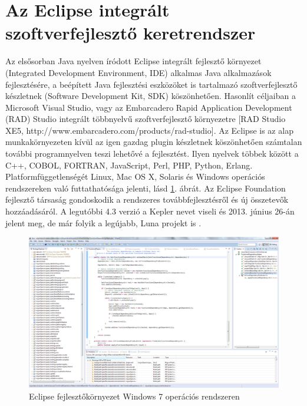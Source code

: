 \section{Az Eclipse integrált szoftverfejlesztő keretrendszer}

Az elsősorban Java nyelven íródott Eclipse integrált fejlesztő környezet (Integrated Development Environment, IDE) alkalmas Java alkalmazások fejlesztésére, a beépített Java fejlesztési eszközöket is tartalmazó szoftverfejlesztő készletnek (Software Development Kit, SDK) köszönhetően. Hasonlít céljaiban a Microsoft Visual Studio, vagy az Embarcadero Rapid Application Development (RAD) Studio integrált többnyelvű szoftverfejlesztő környezetre [RAD Studio XE5, http://www.embarcadero.com/products/rad-studio]. Az Eclipse is az alap munkakörnyezeten kívül az igen gazdag plugin készletnek köszönhetően számtalan további programnyelven teszi lehetővé a fejlesztést. Ilyen nyelvek többek között a C++, COBOL, FORTRAN, JavaScript, Perl, PHP, Python, Erlang. Platformfüggetlenségét Linux, Mac OS X, Solaris és Windows operációs rendszereken való futtathatósága jelenti, lásd \ref{fig:EclipseIDE}. ábrát. Az Eclipse Foundation fejlesztő társaság gondoskodik a rendszeres továbbfejlesztésről és új összetevők hozzáadásáról. A legutóbbi 4.3 verzió a Kepler nevet viseli és 2013. június 26-án jelent meg, de már folyik a legújabb, Luna projekt is \cite{wiki:EclipseIDE}. 

\begin{figure}[h]
\centering
\includegraphics[width=\textwidth]{figures/eclipse-ide.png}
\caption{Eclipse fejlesztőkörnyezet Windows 7 operációs rendszeren}
\label{fig:EclipseIDE}
\end{figure}


